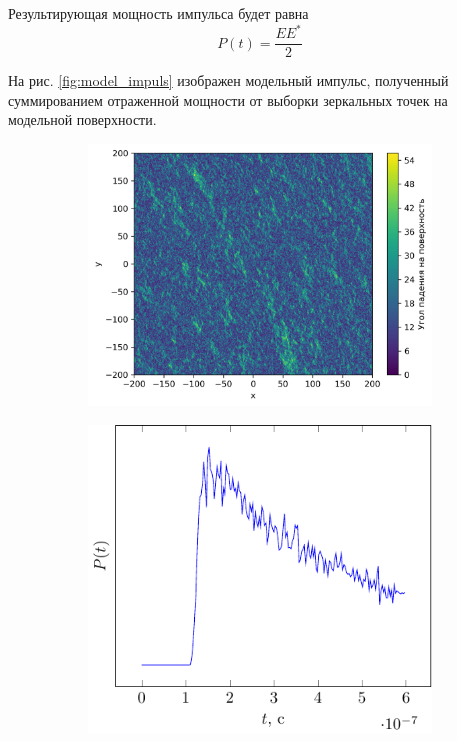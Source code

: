  Результирующая мощность импульса будет равна
 \begin{equation}
     P(t) = \frac{EE^*}{2}
 \end{equation}



 На рис. \ref{fig:model_impuls} изображен модельный импульс, полученный
 суммированием отраженной мощности от выборки зеркальных точек на модельной
 поверхности. 

 \begin{figure}[h]
     \begin{subfigure}{.55\linewidth}
         \centering
         \includegraphics[width=\linewidth]{img/theta0}
         \caption{}
     \end{subfigure}
     \hfill
     \begin{subfigure}{.45\linewidth}
         \centering
         \includegraphics[width=\linewidth]{fig/theta}

\end{subfigure}
\end{figure}
